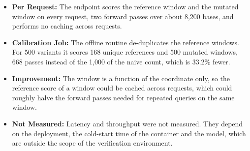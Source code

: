 \begin{itemize}
\item \textbf{Per Request:} The endpoint scores the reference window and the mutated window on every request, two forward passes over about 8,200 bases, and performs no caching across requests.
\item \textbf{Calibration Job:} The offline routine de-duplicates the reference windows. For 500 variants it scores 168 unique references and 500 mutated windows, 668 passes instead of the 1,000 of the naive count, which is 33.2\% fewer.
\item \textbf{Improvement:} The window is a function of the coordinate only, so the reference score of a window could be cached across requests, which could roughly halve the forward passes needed for repeated queries on the same window.
\item \textbf{Not Measured:} Latency and throughput were not measured. They depend on the deployment, the cold-start time of the container and the model, which are outside the scope of the verification environment.
\end{itemize}

